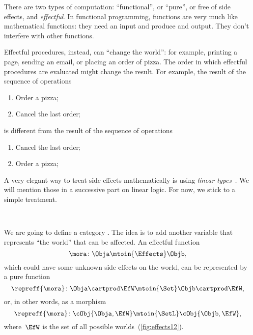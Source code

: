 There are two types of computation: ``functional'', or ``pure'', or free of side effects, and \emph{effectful}.
In functional programming, functions are very much like mathematical functions: they need an input and produce and output.
They don't interfere with other functions.

Effectful procedures, instead, can ``change the world'': for example, printing a page, sending an email, or placing an order of pizza.
The order in which effectful procedures are evaluated might change the result.
For example, the result of the sequence of operations
%
\begin{enumerate}
    \item Order a pizza;
    \item Cancel the last order;
\end{enumerate}
%
is different from the result of the sequence of operations
%
\begin{enumerate}
    \item Cancel the last order;
    \item Order a pizza;
\end{enumerate}

A very elegant way to treat side effects mathematically is using \emph{linear types}~\cite{Wadler90lineartypes}.
We will mention those in a successive part on linear logic.
For now, we stick to a simple treatment.

\begin{marginfigure}
    \centering
    \\
    \caption{}
    \label{fig:effects12}
\end{marginfigure}

We are going to define a category \Effects.
The idea is to add another variable that represents ``the world'' that can be affected.
An effectful function
%
\begin{equation}\label{eq:Eff-morphism}
    \mora\colon \Obja \mtoin{\Effects} \Objb,
\end{equation}
%
which could have some unknown side effects on the world, can be represented by a pure function
\begin{equation}
    \repreff{\mora}\colon \Obja \cartprod \EfW \mtoin{\Set} \Objb \cartprod \EfW,
\end{equation}\label{eq:Eff-rep-morphism-Set}
or, in other words, as a morphism
\begin{equation}\label{eq:Eff-rep-morphism-SetL}
    \repreff{\mora}\colon \cObj{\Obja,\EfW} \mtoin{\SetL} \cObj{\Objb, \EfW},
\end{equation}
%
where~$\EfW$ is the set of all possible worlds~(\cref{fig:effects12}).

